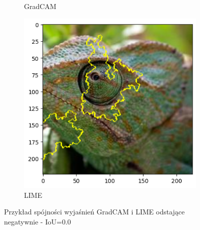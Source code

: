 \begin{figure}[h]
\begin{subfigure}[b]{0.3\textwidth}
		\caption{GradCAM}  \label{}
	\end{subfigure}
	\begin{subfigure}[b]{0.3\textwidth}
		\centering\includegraphics[width=.9\textwidth]{img/examples/appendix/n01694178_23707_lime}
		\caption{LIME}
	\end{subfigure}
	\caption{Przykład spójności wyjaśnień GradCAM i LIME odstające negatywnie - IoU=0.0}
	\label{}
\end{figure}
